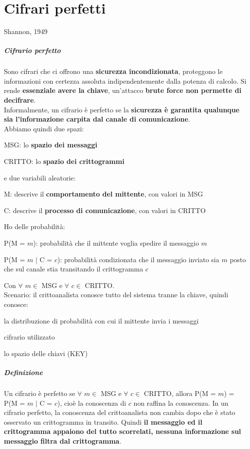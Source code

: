 \documentclass[10pt]{book}
\begin{document}
\chapter{Cifrari perfetti}
Shannon, 1949
\paragraph{Cifrario perfetto} Sono cifrari che ci offrono una \textbf{sicurezza incondizionata}, proteggono le informazioni con certezza assoluta indipendentemente dalla potenza di calcolo. Si rende \textbf{essenziale avere la chiave}, un'attacco \textbf{brute force non permette di decifrare}.\\
Informalmente, un cifrario è perfetto se la \textbf{sicurezza è garantita qualunque sia l'informazione carpita dal canale di comunicazione}.\\
Abbiamo quindi due spazi:
\begin{list}{}{}
	\item MSG: lo \textbf{spazio dei messaggi}
	\item CRITTO: lo \textbf{spazio dei crittogrammi}
\end{list}
e due variabili aleatorie:
\begin{list}{}{}
	\item M: descrive il \textbf{comportamento del mittente}, con valori in MSG
	\item C: descrive il \textbf{processo di comunicazione}, con valori in CRITTO
\end{list}
Ho delle probabilità:
\begin{list}{}{}
	\item P(M = $m$): probabilità che il mittente voglia spedire il messaggio $m$
	\item P(M = $m$ $|$ C = $c$): probabilità condizionata che il messaggio inviato sia $m$ posto che sul canale stia transitando il crittogramma $c$
\end{list}
Con $\forall$ $m\in$ MSG e $\forall$ $c\in$ CRITTO.\\
Scenario: il crittoanalista conosce tutto del sistema tranne la chiave, quindi conosce:
\begin{list}{}{}
	\item la distribuzione di probabilità con cui il mittente invia i messaggi
	\item cifrario utilizzato
	\item lo spazio delle chiavi (KEY)
\end{list}
\paragraph{Definizione} Un cifrario è perfetto se $\forall$ $m\in$ MSG e $\forall$ $c\in$ CRITTO, allora P(M = $m$) = P(M = $m$ $|$ C = $c$), cioè la conoscenza di $c$ non raffina la conoscenza.
In un cifrario perfetto, la conoscenza del crittoanalista non cambia dopo che è stato osservato un crittogramma in transito. Quindi \textbf{il messaggio ed il crittogramma appaiono del tutto scorrelati, nessuna informazione sul messaggio filtra dal crittogramma}.
\end{document}

